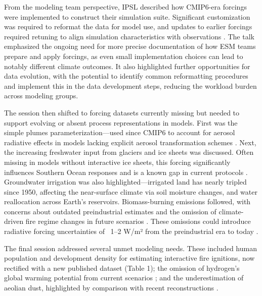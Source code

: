 \documentclass{ametsocV6.1}
\begin{document}
From the modeling team perspective, IPSL described how CMIP6-era forcings were implemented to construct their simulation suite. Significant customization was required to reformat the data for model use, and updates to earlier forcings required retuning to align simulation characteristics with observations \citep{lurton_implementation_2020}. The talk emphasized the ongoing need for more precise documentation of how ESM teams prepare and apply forcings, as even small implementation choices can lead to notably different climate outcomes. It also highlighted further opportunities for data evolution, with the potential to identify common reformatting procedures and implement this in the data development steps, reducing the workload burden across modeling groups. 

The session then shifted to forcing datasets currently missing but needed to support evolving or absent process representations in models. First was the simple plumes parameterization—used since CMIP6 to account for aerosol radiative effects in models lacking explicit aerosol transformation schemes \citep[e.g.,][]{stevens_macv2-sp_2017,fiedler_anthropogenic_2019}. Next, the increasing freshwater input from glaciers and ice sheets was discussed. Often missing in models without interactive ice sheets, this forcing significantly influences Southern Ocean responses and is a known gap in current protocols \citep[e.g.,][]{roach_winds_2023,schmidt_anomalous_2023}. Groundwater irrigation was also highlighted—irrigated land has nearly tripled since 1950, affecting the near-surface climate via soil moisture changes, and water reallocation across Earth's reservoirs. Biomass-burning emissions followed, with concerns about outdated preindustrial estimates and the omission of climate-driven fire regime changes in future scenarios \citep[e.g.,][]{chen_multi-decadal_2023,hamilton_global_2024}. These omissions could introduce radiative forcing uncertainties of ~1–2 W/m² from the preindustrial era to today \citep{hamilton_reassessment_2018,wan_importance_2021}.

The final session addressed several unmet modeling needs. These included human population and development density for estimating interactive fire ignitions, now rectified with a new published dataset (Table 1); the omission of hydrogen’s global warming potential from current scenarios \citep[e.g.,][]{sand_multi-model_2023}; and the underestimation of aeolian dust, highlighted by comparison with recent reconstructions \citep[e.g.,][]{kok_mineral_2023}.
\end{document}
